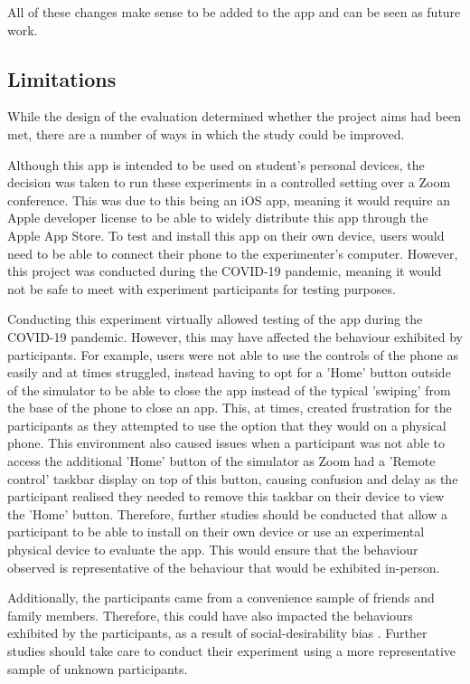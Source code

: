 \documentclass{l4proj}
\begin{document}
All of these changes make sense to be added to the app and can be seen as future work.

\subsection{Limitations}

While the design of the evaluation determined whether the project aims had been met, there are a number of ways in which the study could be improved.

Although this app is intended to be used on student's personal devices, the decision was taken to run these experiments in a controlled setting over a Zoom conference. This was due to this being an iOS app, meaning it would require an Apple developer license to be able to widely distribute this app through the Apple App Store. To test and install this app on their own device, users would need to be able to connect their phone to the experimenter's computer. However, this project was conducted during the COVID-19 pandemic, meaning it would not be safe to meet with experiment participants for testing purposes. 

Conducting this experiment virtually allowed testing of the app during the COVID-19 pandemic. However, this may have affected the behaviour exhibited by participants. For example, users were not able to use the controls of the phone as easily and at times struggled, instead having to opt for a 'Home' button outside of the simulator to be able to close the app instead of the typical 'swiping' from the base of the phone to close an app. This, at times, created frustration for the participants as they attempted to use the option that they would on a physical phone. This environment also caused issues when a participant was not able to access the additional 'Home' button of the simulator as Zoom had a 'Remote control' taskbar display on top of this button, causing confusion and delay as the participant realised they needed to remove this taskbar on their device to view the 'Home' button. Therefore, further studies should be conducted that allow a participant to be able to install on their own device or use an experimental physical device to evaluate the app. This would ensure that the behaviour observed is representative of the behaviour that would be exhibited in-person.

Additionally, the participants came from a convenience sample of friends and family members. Therefore, this could have also impacted the behaviours exhibited by the participants, as a result of social-desirability bias \citep{lavrakas_social_2008}. Further studies should take care to conduct their experiment using a more representative sample of unknown participants.
\end{document}
